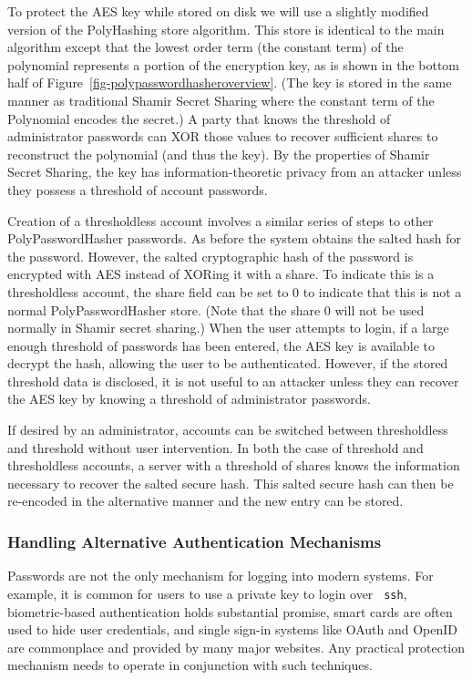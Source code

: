 To protect the AES key while stored on disk we will use a slightly modified
version of the PolyHashing store algorithm.   This store is identical to 
the main algorithm except
that the lowest order term (the constant term) of the polynomial represents 
a portion of the encryption key, as is shown in the bottom half of 
Figure~\ref{fig-polypasswordhasheroverview}.   (The key is stored in the same manner
as traditional Shamir Secret Sharing
where the constant term of the Polynomial encodes the secret.)
A party that knows the threshold of administrator passwords can XOR those
values to recover sufficient shares to reconstruct the polynomial (and thus
the key).  
By the properties of Shamir Secret Sharing, the key has information-theoretic 
privacy from an attacker unless they possess a threshold of account passwords.



Creation of a thresholdless account involves a similar series of steps to
other PolyPasswordHasher passwords.   As before the system obtains the 
salted hash for the password.   However, the salted cryptographic hash of 
the password is encrypted with AES instead of XORing it with a share.
To indicate this is a thresholdless account, the share field can 
be set to 0 to indicate that this is not a normal PolyPasswordHasher 
store.   (Note that the share 0 will not be used normally in Shamir secret
sharing.)   When the user attempts to login, if a large enough 
threshold of passwords has been entered, the AES key is available to decrypt 
the hash, allowing the user to  be authenticated.   However,
if the stored threshold data is disclosed, it is not useful to an attacker
unless they can recover the AES key by knowing a threshold of
administrator passwords.


If desired by an administrator, accounts can be switched between thresholdless
and threshold without user intervention.
In both the case of threshold and thresholdless accounts, a server with
a threshold of shares knows the information necessary to recover the salted 
secure hash.   This salted secure hash can then be re-encoded in the 
alternative manner and the new entry can be stored.

\subsubsection{Handling Alternative Authentication Mechanisms}

Passwords are not the only mechanism for logging into modern systems.   For
example, it is common for users to use a private key to login over {\tt
ssh}, biometric-based authentication holds substantial promise, 
smart cards are often used to hide user credentials, and single
sign-in systems like OAuth and OpenID are commonplace and provided by 
many major websites.   Any practical protection mechanism needs to operate
in conjunction with such techniques.

